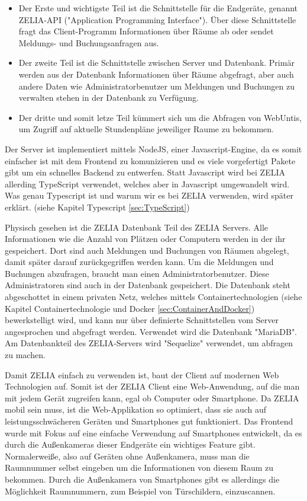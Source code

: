 \begin{itemize}
    \item Der Erste und wichtigste Teil ist die Schnittstelle für die Endgeräte, genannt ZELIA-API ("Application Programming Interface"). Über diese Schnittstelle fragt das Client-Programm Informationen über Räume ab oder sendet Meldungs- und Buchungsanfragen aus.
    \item Der zweite Teil ist die Schnittstelle zwischen Server und Datenbank. Primär werden aus der Datenbank Informationen über Räume abgefragt, aber auch andere Daten wie Administratorbenutzer um Meldungen und Buchungen zu verwalten stehen in der Datenbank zu Verfügung. 
    \item Der dritte und somit letze Teil kümmert sich um die Abfragen von WebUntis, um Zugriff auf aktuelle Stundenpläne jeweiliger Raume zu bekommen.
\end{itemize}

Der Server ist implementiert mittels NodeJS, einer Javascript-Engine, da es somit einfacher ist mit dem Frontend zu komunizieren und es viele vorgefertigt Pakete gibt um ein schnelles Backend zu entwerfen. Statt Javascript wird bei ZELIA allerding TypeScript verwendet, welches aber in Javascript umgewandelt wird. Was genau Typescript ist und warum wir es bei ZELIA verwenden, wird später erklärt. (siehe Kapitel Typescript \ref{sec:TypeScript})


Physisch gesehen ist die ZELIA Datenbank Teil des ZELIA Servers. Alle Informationen wie die Anzahl von Plätzen oder Computern werden in der ihr gespeichert. Dort sind auch Meldungen und Buchungen von Räumen abgelegt, damit später darauf zurückgegriffen werden kann. Um die Meldungen und Buchungen abzufragen, braucht man einen Administratorbenutzer. Diese Administratoren sind auch in der Datenbank gespeichert. Die Datenbank steht abgeschottet in einem privaten Netz, welches mittels Containertechnologien (siehe Kapitel Containertechnologie und Docker \ref{sec:ContainerAndDocker}) bewerkstelligt wird, und kann nur über definierte Schnittstellen vom Server angesprochen und abgefragt werden. Verwendet wird die Datenbank "MariaDB". Am Datenbankteil des ZELIA-Servers wird "Sequelize" verwendet, um abfragen zu machen.


Damit ZELIA einfach zu verwenden ist, baut der Client auf modernen Web Technologien auf. Somit ist der ZELIA Client eine Web-Anwendung, auf die man mit jedem Gerät zugreifen kann, egal ob Computer oder Smartphone. Da ZELIA mobil sein muss, ist die Web-Applikation so optimiert, dass sie auch auf leistungsschwächeren Geräten und Smartphones gut funktioniert. Das Frontend wurde mit Fokus auf eine einfache Verwendung auf Smartphones entwickelt, da es durch die Außenkameras dieser Endgeräte ein wichtiges Feature gibt. Normalerweiße, also auf Geräten ohne Außenkamera, muss man die Raumnummer selbst eingeben um die Informationen von diesem Raum zu bekommen. Durch die Außenkamera von Smartphones gibt es allerdings die Möglichkeit Raumnummern, zum Beispiel von Türschildern, einzuscannen. 

